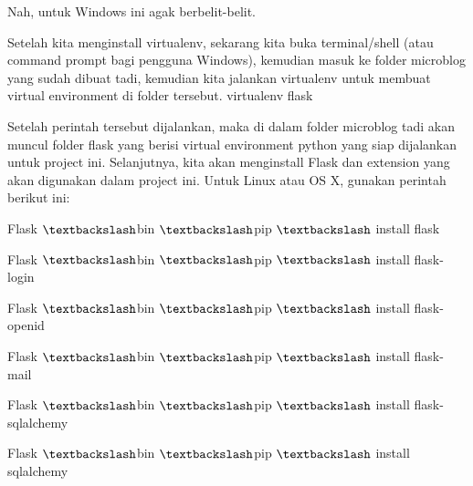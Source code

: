 \noindent 
{\fontsize{14pt}{14pt}\selectfont Nah, untuk Windows ini agak berbelit-belit. \\} \par
\noindent 
{\fontsize{14pt}{14pt}\selectfont Setelah kita menginstall virtualenv, sekarang kita buka terminal/shell (atau command prompt bagi pengguna Windows), kemudian masuk ke folder microblog yang sudah dibuat tadi, kemudian kita jalankan virtualenv untuk membuat virtual environment di folder tersebut.\vspace{\baselineskip}
virtualenv flask \\} \par
\noindent 
{\fontsize{14pt}{14pt}\selectfont Setelah perintah tersebut dijalankan, maka di dalam folder microblog tadi akan muncul folder flask yang berisi virtual environment python yang siap dijalankan untuk project ini. Selanjutnya, kita akan menginstall Flask dan extension yang akan digunakan dalam project ini. Untuk Linux atau OS X, gunakan perintah berikut ini: \\} \par
\vspace{14pt}
\noindent 
{\fontsize{14pt}{14pt}\selectfont Flask $  \textbackslash  $bin $  \textbackslash  $pip $  \textbackslash  $ install flask \\} \par
\vspace{14pt}
\noindent 
{\fontsize{14pt}{14pt}\selectfont Flask $  \textbackslash  $bin $  \textbackslash  $pip $  \textbackslash  $ install flask-login \\} \par
\vspace{14pt}
\noindent 
{\fontsize{14pt}{14pt}\selectfont Flask $  \textbackslash  $bin $  \textbackslash  $pip $  \textbackslash  $ install flask-openid \\} \par
\vspace{14pt}
\noindent 
{\fontsize{14pt}{14pt}\selectfont Flask $  \textbackslash  $bin $  \textbackslash  $pip $  \textbackslash  $ install flask-mail \\} \par
\vspace{14pt}
\noindent 
{\fontsize{14pt}{14pt}\selectfont Flask $  \textbackslash  $bin $  \textbackslash  $pip $  \textbackslash  $ install flask-sqlalchemy \\} \par
\vspace{14pt}
\noindent 
{\fontsize{14pt}{14pt}\selectfont Flask $  \textbackslash  $bin $  \textbackslash  $pip $  \textbackslash  $ install sqlalchemy \\} \par
